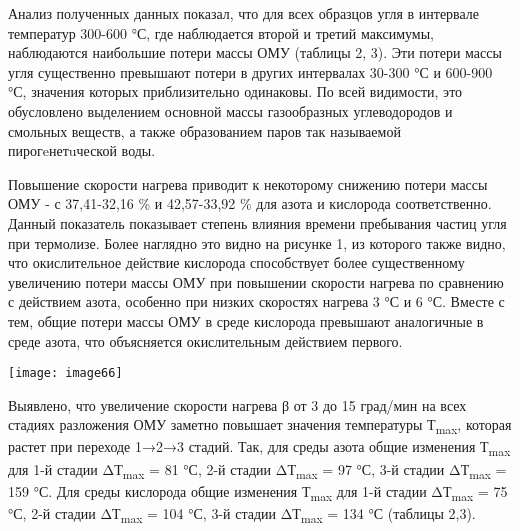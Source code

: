 \begin{multicols}{2}
Анализ полученных данных показал, что для всех образцов угля в интервале
температур 300-600 °С, где наблюдается второй и третий максимумы,
наблюдаются наибольшие потери массы ОМУ (таблицы 2, 3). Эти потери массы
угля существенно превышают потери в других интервалах 30-300 °С и
600-900 °С, значения которых приблизительно одинаковы. По всей
видимости, это обусловлено выделением основной массы газообразных
углеводородов и смольных веществ, а также образованием паров так
называемой пирогeнетuческой воды.

Повышение скорости нагрева приводит к некоторому снижению потери массы
ОМУ - с 37,41-32,16 \% и 42,57-33,92 \% для азота и кислорода
соответственно. Данный показатель показывает степень влияния времени
пребывания частиц угля при термолизе. Более наглядно это видно на
рисунке 1, из которого также видно, что окислительное действие кислорода
способствует более существенному увеличению потери массы ОМУ при
повышении скорости нагрева по сравнению с действием азота, особенно при
низких скоростях нагрева 3 °С и 6 °С. Вместе с тем, общие потери массы
ОМУ в среде кислорода превышают аналогичные в среде азота, что
объясняется окислительным действием первого.



{\centering
\texttt{[image: image66]}
}

Выявлено, что увеличение скорости нагрева β от 3 до 15 град/мин на всех
стадиях разложения ОМУ заметно повышает значения температуры
Т\textsubscript{max}, которая растет при переходе 1→2→3 стадий. Так, для
среды азота общие изменения Т\textsubscript{max} для 1-й стадии
ΔТ\textsubscript{max} = 81 °С, 2-й стадии ΔТ\textsubscript{max} = 97 °С,
3-й стадии ΔТ\textsubscript{max} = 159 °С. Для среды кислорода общие
изменения Т\textsubscript{max} для 1-й стадии ΔТ\textsubscript{max} = 75
°С, 2-й стадии ΔТ\textsubscript{max} = 104 °С, 3-й стадии
ΔТ\textsubscript{max} = 134 °С (таблицы 2,3).


\end{multicols}
